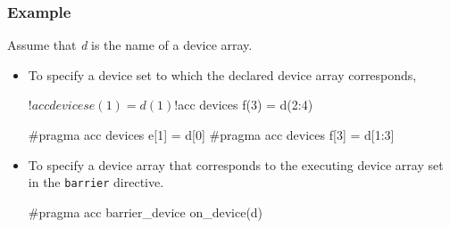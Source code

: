 \subsubsection*{Example}
Assume that {\it d} is the name of a device array.
\begin{itemize}
\item To specify a device set to which the declared device array corresponds,\\

\begin{myfigure}
\begin{minipage}{0.43\hsize}
\begin{center}
\begin{XACCFexampleL}
!$acc devices e(1) = d(1)
!$acc devices f(3) = d(2:4)
\end{XACCFexampleL}
\end{center}
\end{minipage}
%
\begin{minipage}{0.51\hsize}
\begin{center}
\begin{XACCCexampleR}
#pragma acc devices e[1] = d[0]
#pragma acc devices f[3] = d[1:3]
\end{XACCCexampleR}
\end{center}
\end{minipage}
\end{myfigure}

\item To specify a device array that corresponds to the executing device array set in the {\tt barrier} directive.

\begin{myfigure}
\begin{minipage}{0.43\hsize}
\begin{center}
\end{center}
\end{minipage}
%
\begin{minipage}{0.51\hsize}
\begin{center}
\begin{XACCCexampleR}
#pragma acc barrier_device on_device(d)
\end{XACCCexampleR}
\end{center}
\end{minipage}
\end{myfigure}

\end{itemize}

